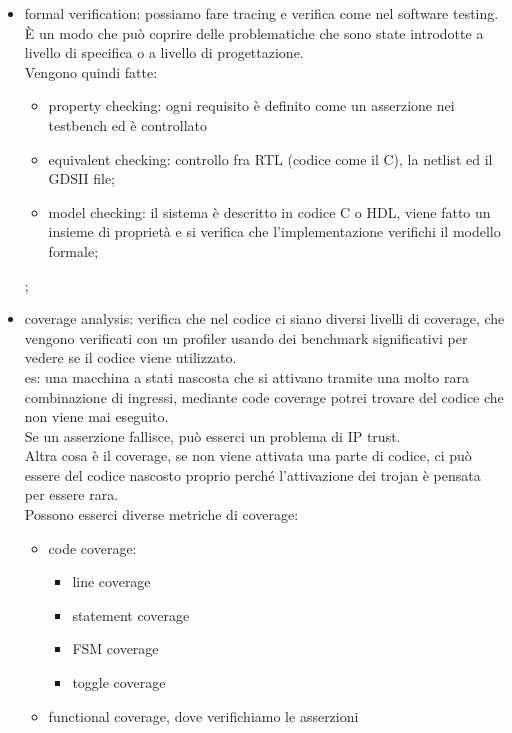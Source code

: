 \documentclass[oneside, 12pt]{extbook}
\begin{document}
\begin{itemize}
	\item formal verification: possiamo fare tracing e verifica come nel software testing.
	\\È un modo che può coprire delle problematiche che sono state introdotte a livello di specifica o a livello di progettazione. 
	\\Vengono quindi fatte:
	\begin{itemize}
		\item property checking: ogni requisito è definito come un asserzione nei testbench ed è controllato
		\item equivalent checking: controllo fra RTL (codice come il C), la netlist ed il GDSII file;
		\item model checking: il sistema è descritto in codice C o HDL, viene fatto un insieme di proprietà e si verifica che l'implementazione verifichi il modello formale;
	\end{itemize};
	\item coverage analysis: verifica che nel codice ci siano diversi livelli di coverage, che vengono verificati con un profiler usando dei benchmark significativi per vedere se il codice viene utilizzato.
	\\es: una macchina a stati nascosta che si attivano tramite una molto rara combinazione di ingressi, mediante code coverage potrei trovare del codice che non viene mai eseguito.
	\\Se un asserzione fallisce, può esserci un problema di IP trust.\\Altra cosa è il coverage, se non viene attivata una parte di codice, ci può essere del codice nascosto proprio perché l'attivazione dei trojan è pensata per essere rara.
	\\Possono esserci diverse metriche di coverage:
	\begin{itemize}
		\item code coverage:
		\begin{itemize}
			\item line coverage
			\item statement coverage
			\item FSM coverage
			\item toggle coverage
		\end{itemize}
		\item functional coverage, dove verifichiamo le asserzioni
	\end{itemize}
\end{itemize}
\end{document}
